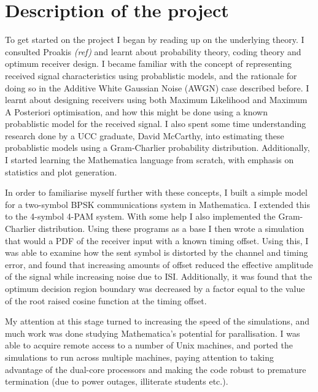\section{Description of the project}

To get started on the project I began by reading up on the underlying
theory. I consulted Proakis \emph{(ref)} and learnt about probability
theory, coding theory and optimum receiver design. I became familiar
with the concept of representing received signal characteristics using
probablistic models, and the rationale for doing so in the Additive
White Gaussian Noise (AWGN) case described before. I learnt about
designing receivers using both Maximum Likelihood and Maximum A
Posteriori optimisation, and how this might be done using a known
probablistic model for the received signal. I also spent some time
understanding research done by a UCC graduate, David McCarthy, into
estimating these probablistic models using a Gram-Charlier probability
distribution. Additionally, I started learning the Mathematica language
from scratch, with emphasis on statistics and plot generation.

In order to familiarise myself further with these concepts, I built a
simple model for a two-symbol BPSK communications system in Mathematica.
I extended this to the 4-symbol 4-PAM system. With some help I also
implemented the Gram-Charlier distribution. Using these programs as a
base I then wrote a simulation that would a PDF of the receiver input
with a known timing offset. Using this, I was able to examine how the
sent symbol is distorted by the channel and timing error, and found that
increasing amounts of offset reduced the effective amplitude of the
signal while increasing noise due to ISI. Additionally, it was found
that the optimum decision region boundary was decreased by a factor
equal to the value of the root raised cosine function at the timing
offset.

My attention at this stage turned to increasing the speed of the
simulations, and much work was done studying Mathematica's potential for
parallisation. I was able to acquire remote access to a number of Unix
machines, and ported the simulations to run across multiple machines,
paying attention to taking advantage of the dual-core processors and
making the code robust to premature termination (due to power outages,
illiterate students etc.).

